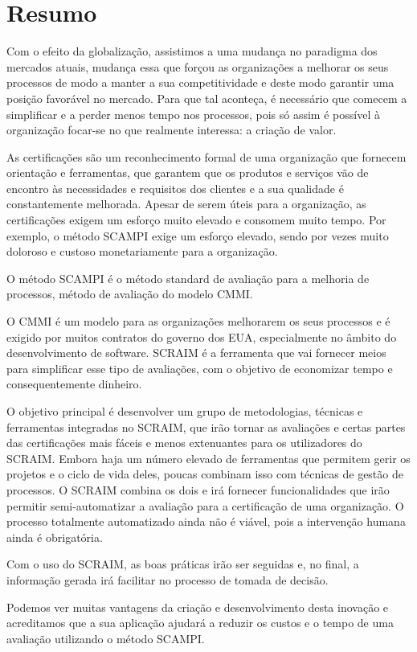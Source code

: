 \chapter*{Resumo}
Com o efeito da globalização, assistimos a uma mudança no paradigma dos mercados atuais, mudança essa que forçou as organizações a melhorar os seus processos de modo a manter a sua competitividade e deste modo garantir uma posição favorável no mercado. Para que tal aconteça, é necessário que comecem a simplificar e a perder menos tempo nos processos, pois só assim é possível à organização focar-se no que realmente interessa: a criação de valor.

As certificações são um reconhecimento formal de uma organização que fornecem orientação e ferramentas, que garantem que os produtos e serviços vão de encontro às necessidades e requisitos dos clientes e a sua qualidade é constantemente melhorada. Apesar de serem úteis para a organização, as certificações exigem um esforço muito elevado e consomem muito tempo. Por exemplo, o método SCAMPI exige um esforço elevado, sendo por vezes muito doloroso e custoso monetariamente para a organização.

O método SCAMPI é o método standard de avaliação para a melhoria de processos, método de avaliação do modelo CMMI.

O CMMI é um modelo para as organizações melhorarem os seus processos e é exigido por muitos contratos do governo dos EUA, especialmente no âmbito do desenvolvimento de software. SCRAIM é a ferramenta que vai fornecer meios para simplificar esse tipo de avaliações, com o objetivo de economizar tempo e consequentemente dinheiro.

O objetivo principal é desenvolver um grupo de metodologias, técnicas e ferramentas integradas no SCRAIM, que irão tornar as avaliações e certas partes das certificações mais fáceis e menos extenuantes para os utilizadores do SCRAIM.
Embora haja um número elevado de ferramentas que permitem gerir os projetos e o ciclo de vida deles, poucas combinam isso com técnicas de gestão de processos. O SCRAIM combina os dois e irá fornecer funcionalidades que irão permitir semi-automatizar a avaliação para a certificação de uma organização. O processo totalmente automatizado ainda não é viável, pois a intervenção humana ainda é obrigatória.

Com o uso do SCRAIM, as boas práticas irão ser seguidas e, no final, a informação gerada irá facilitar no processo de tomada de decisão.

Podemos ver muitas vantagens da criação e desenvolvimento desta inovação e acreditamos que a sua aplicação ajudará a reduzir os custos e o tempo de uma avaliação utilizando o método SCAMPI.




